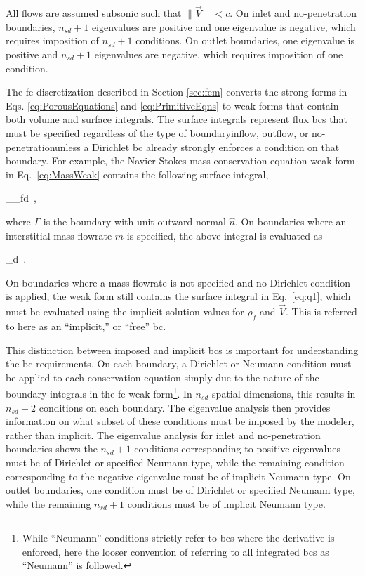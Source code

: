 All flows are assumed subsonic such that \(\|\vec{V}\|<c\). On inlet and no-penetration boundaries, \(n_{sd}+1\) eigenvalues are positive and one eigenvalue is negative, which requires imposition of \(n_{sd}+1\) conditions. On outlet boundaries, one eigenvalue is positive and \(n_{sd}+1\) eigenvalues are negative, which requires imposition of one condition.

The \gls{fe} discretization described in Section \ref{sec:fem} converts the strong forms in Eqs. \eqref{eq:PorousEquations} and \eqref{eq:PrimitiveEqns} to weak forms that contain both volume and surface integrals. The surface integrals represent flux \glspl{bc} that must be specified regardless of the type of boundary\mdash inflow, outflow, or no-penetration\mdash unless a Dirichlet \gls{bc} already strongly enforces a condition on that boundary. For example, the Navier-Stokes mass conservation equation weak form in Eq.\ \eqref{eq:MassWeak} contains the following surface integral,

\beq
\label{eq:q1}
\int_{\Gamma}\epsilon\rho_f\cdot{}d\Gamma\ ,
\eeq

\noindent where \(\Gamma\) is the boundary with unit outward normal \(\hat{n}\). On boundaries where an interstitial mass flowrate \(\dot{m}\) is specified, the above integral is evaluated as

\beq
\int_{\Gamma}\epsilon{}d\Gamma\ .
\eeq

\noindent On boundaries where a mass flowrate is not specified and no Dirichlet condition is applied, the weak form still contains the surface integral in Eq.\ \eqref{eq:q1}, which must be evaluated using the implicit solution values for \(\rho_f\) and \(\vec{V}\). This is referred to here as an ``implicit,'' or ``free'' \gls{bc}. 

This distinction between imposed and implicit \glspl{bc} is important for understanding the \gls{bc} requirements. On each boundary, a Dirichlet or Neumann condition must be applied to each conservation equation simply due to the nature of the boundary integrals in the \gls{fe} weak form\hspace{0.02cm}\footnote{While ``Neumann'' conditions strictly refer to \glspl{bc} where the derivative is enforced, here the looser convention of referring to all integrated \glspl{bc} as ``Neumann'' is followed.}. In \(n_{sd}\) spatial dimensions, this results in \(n_{sd}+2\) conditions on each boundary. The eigenvalue analysis then provides information on what subset of these conditions must be imposed by the modeler, rather than implicit. The eigenvalue analysis for inlet and no-penetration boundaries shows the \(n_{sd}+1\) conditions corresponding to positive eigenvalues must be of Dirichlet or specified Neumann type, while the remaining condition corresponding to the negative eigenvalue must be of implicit Neumann type. On outlet boundaries, one condition must be of Dirichlet or specified Neumann type, while the remaining \(n_{sd}+1\) conditions must be of implicit Neumann type. 

